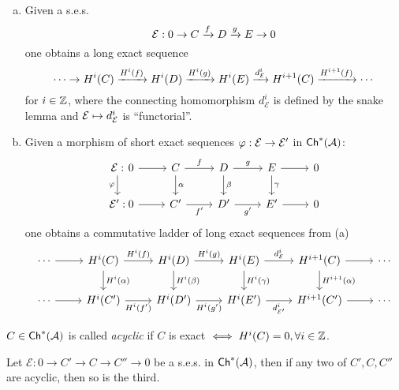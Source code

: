 \documentclass[a4paper]{report}
\begin{document}
\begin{thm}
\begin{enumerate}[(a)]
  \item Given a s.e.s. \[\mathcal E: 0 \to C \xrightarrow f D \xrightarrow g E \to 0\]
        one obtains a long exact sequence \[\cdots \to H^{i}(C) \xrightarrow {H^{i}(f)} H^{i}(D) \xrightarrow{H^{i}(g)} H^{i}(E) \xrightarrow{d^{i}_{\mathcal E}} H^{i+1}(C) \xrightarrow{H^{i+1}(f)} \cdots\]
        for $i \in \mathbb{Z}$, where the connecting homomorphism $d^{i}_{\mathcal E}$ is defined by the snake lemma and $\mathcal E \mapsto d_{\mathcal E}^{i}$ is ``functorial''.
  \item Given a morphism of short exact sequences $\varphi: \mathcal E \to \mathcal E'$ in $\mathsf{Ch}^*(\mathcal{A})$: \[\begin{tikzcd}
\mathcal E: \arrow[d, "\varphi"'] &[-30] 0 \arrow[r] & C \arrow[r, "f"] \arrow[d, "\alpha"] & D \arrow[r, "g"] \arrow[d, "\beta"] & E \arrow[r] \arrow[d, "\gamma"] & 0 \\
\mathcal E':                      & 0 \arrow[r] & C' \arrow[r, "f'"']                  & D' \arrow[r, "g'"']                 & E' \arrow[r]                    & 0
\end{tikzcd}\]
        one obtains a commutative ladder of long exact sequences from (a)
        \[\begin{tikzcd}
\cdots \arrow[r] & H^i(C) \arrow[d, "H^{i}(\alpha)"] \arrow[r, "H^{i}(f)"] & H^i(D) \arrow[d, "H^{i}(\beta)"] \arrow[r, "H^{i}(g)"] & H^i(E) \arrow[d, "H^{i}(\gamma)"] \arrow[r, "d_{\mathcal E}^i"] & H^{i+1}(C) \arrow[d, "H^{i+1}(\alpha)"] \arrow[r] & \cdots \\
\cdots \arrow[r] & H^i(C') \arrow[r, "H^{i}(f')"']                         & H^i(D') \arrow[r, "H^i(g')"']                          & H^i(E') \arrow[r, "d_{\mathcal E'}^i"']                         & H^{i+1}(C') \arrow[r]                             & \cdots
\end{tikzcd}\]


\end{enumerate}

\end{thm}


\begin{defi}
$C \in \mathsf{Ch}^*(\mathcal{A})$ is called \emph{acyclic} if $C$ is exact $\iff H^{i}(C) = 0, \forall i \in \mathbb{Z}$.
\end{defi}



\begin{cor}[To theorem 45]
Let $\mathcal E: 0 \to C' \to C \to C'' \to 0$ be a s.e.s. in $\mathsf{Ch}^*(\mathcal{A})$, then if any two of $C', C, C''$ are acyclic, then so is the third.
\end{cor}
\end{document}
